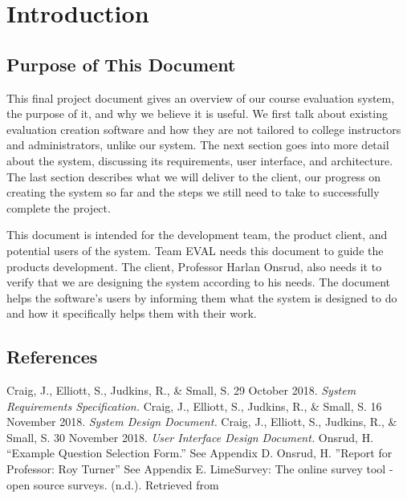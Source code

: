 \documentclass{article}
\begin{document}
\tableofcontents

\newpage

\section{Introduction}
 

\subsection{Purpose of This Document}

This final project document gives an overview of our course evaluation system, the purpose of it, and why we believe it is useful. We first talk about existing evaluation creation software and how they are not tailored to college instructors and administrators, unlike our system. The next section goes into more detail about the system, discussing its requirements, user interface, and architecture. The last section describes what we will deliver to the client, our progress on creating the system so far and the steps we still need to take to successfully complete the project.

This document is intended for the development team, the product client, and potential users of the system. Team EVAL needs this document to guide the products development. The client, Professor Harlan Onsrud, also needs it to verify that we are designing the system according to his needs. The document helps the software's users by informing them what the system is designed to do and how it specifically helps them with their work.

\subsection{References}

Craig, J., Elliott, S., Judkins, R., \& Small, S. 29 October 2018. \textit{System Requirements Specification.}
\vspace{3mm}\newline
Craig, J., Elliott, S., Judkins, R., \& Small, S. 16 November 2018. \textit{System Design Document.}
\vspace{3mm}\newline
Craig, J., Elliott, S., Judkins, R., \& Small, S. 30 November 2018. \textit{User Interface Design Document.}
\vspace{3mm}\newline
Onsrud, H. ``Example Question Selection Form.'' See Appendix D.
\vspace{3mm}\newline
Onsrud, H. ''Report for Professor: Roy Turner'' See Appendix E.
\vspace{3mm}\newline
LimeSurvey: The online survey tool - open source surveys. (n.d.). Retrieved from
\end{document}
